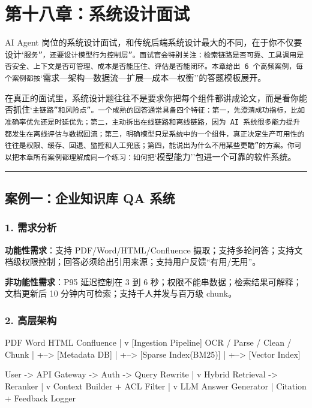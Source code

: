 \chapter{第十八章：系统设计面试}

AI Agent 岗位的系统设计面试，和传统后端系统设计最大的不同，在于你不仅要设计`\texttt{服务''，还要设计}\texttt{模型行为控制层''。面试官会特别关注：检索链路是否可靠、工具调用是否安全、上下文是否可管理、成本是否能压住、评估是否能闭环。本章给出 6 个高频案例，每个案例都按}`需求---架构---数据流---扩展---成本---权衡''的答题模板展开。


在真正的面试里，系统设计题往往不是要求你把每个组件都讲成论文，而是看你能否抓住`\texttt{主链路''和}\texttt{风险点''。一个成熟的回答通常具备四个特征：第一，先澄清成功指标，比如准确率优先还是时延优先；第二，主动拆出在线链路和离线链路，因为 AI 系统很多能力提升都发生在离线评估与数据回流；第三，明确模型只是系统中的一个组件，真正决定生产可用性的往往是权限、缓存、回退、监控和人工兜底；第四，能说出为什么不用某些更}\texttt{酷''的方案。你可以把本章所有案例都理解成同一个练习：如何把}`模型能力''包进一个可靠的软件系统。


\bigskip\hrule\bigskip

\section{案例一：企业知识库 QA 系统}

\subsection{1. 需求分析}
\textbf{功能性需求}：支持 PDF/Word/HTML/Confluence 摄取；支持多轮问答；支持文档级权限控制；回答必须给出引用来源；支持用户反馈``有用/无用''。


\textbf{非功能性需求}：P95 延迟控制在 3 到 6 秒；权限不能串数据；检索结果可解释；文档更新后 10 分钟内可检索；支持千人并发与百万级 chunk。


\subsection{2. 高层架构}
\begin{codeblock}
 PDF  Word  HTML  Confluence
          |
          v
   [Ingestion Pipeline]
 OCR / Parse / Clean / Chunk
          |
          +--> [Metadata DB]
          |
          +--> [Sparse Index(BM25)]
          |
          +--> [Vector Index]

User -> API Gateway -> Auth -> Query Rewrite
                          |
                          v
               Hybrid Retrieval -> Reranker
                          |
                          v
                 Context Builder + ACL Filter
                          |
                          v
                  LLM Answer Generator
                          |
                 Citation + Feedback Logger
\end{codeblock}

